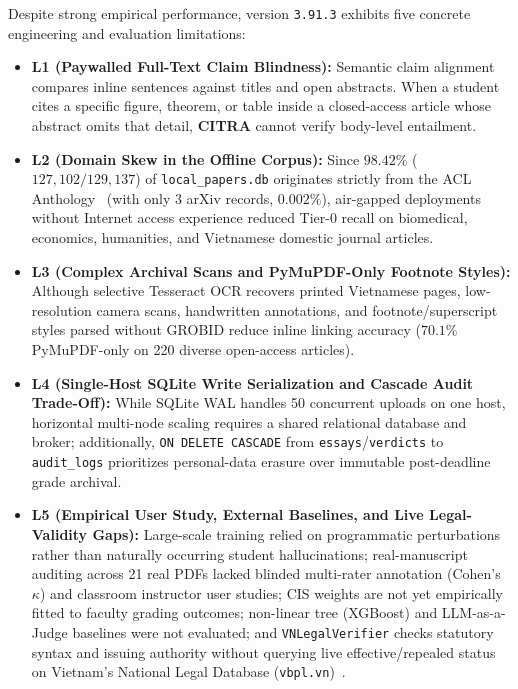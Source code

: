 Despite strong empirical performance, version \texttt{3.91.3} exhibits five concrete engineering and evaluation limitations:
{\setlength{\itemsep}{1pt}
\begin{itemize}
    \item \textbf{L1 (Paywalled Full-Text Claim Blindness):} Semantic claim alignment compares inline sentences against titles and open abstracts. When a student cites a specific figure, theorem, or table inside a closed-access article whose abstract omits that detail, \textbf{CITRA} cannot verify body-level entailment.
    \item \textbf{L2 (Domain Skew in the Offline Corpus):} Since $98.42\%$ ($127{,}102 / 129{,}137$) of \texttt{local\_papers.db} originates strictly from the ACL Anthology~\cite{acl-anthology} (with only 3 arXiv records, $0.002\%$), air-gapped deployments without Internet access experience reduced Tier-0 recall on biomedical, economics, humanities, and Vietnamese domestic journal articles.
    \item \textbf{L3 (Complex Archival Scans and PyMuPDF-Only Footnote Styles):} Although selective Tesseract OCR recovers printed Vietnamese pages, low-resolution camera scans, handwritten annotations, and footnote/superscript styles parsed without GROBID reduce inline linking accuracy ($70.1\%$ PyMuPDF-only on 220 diverse open-access articles).
    \item \textbf{L4 (Single-Host SQLite Write Serialization and Cascade Audit Trade-Off):} While SQLite WAL handles 50 concurrent uploads on one host, horizontal multi-node scaling requires a shared relational database and broker; additionally, \texttt{ON DELETE CASCADE} from \texttt{essays}/\texttt{verdicts} to \texttt{audit\_logs} prioritizes personal-data erasure over immutable post-deadline grade archival.
    \item \textbf{L5 (Empirical User Study, External Baselines, and Live Legal-Validity Gaps):} Large-scale training relied on programmatic perturbations rather than naturally occurring student hallucinations; real-manuscript auditing across 21 real PDFs lacked blinded multi-rater annotation (Cohen's $\kappa$) and classroom instructor user studies; CIS weights are not yet empirically fitted to faculty grading outcomes; non-linear tree (XGBoost) and LLM-as-a-Judge baselines were not evaluated; and \texttt{VNLegalVerifier} checks statutory syntax and issuing authority without querying live effective/repealed status on Vietnam's National Legal Database (\texttt{vbpl.vn})~\cite{vbpl-vn}.
\end{itemize}}

